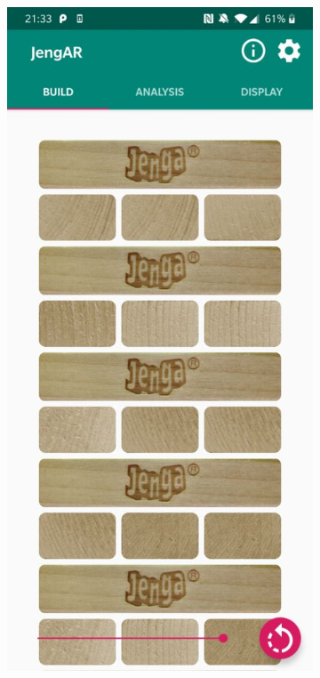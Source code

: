\begin{figure}[ht]
\begin{subfigure}{0.22\textwidth}
\includegraphics[width=\linewidth]{images/implementation/build-start}

\end{subfigure}
\end{figure}
